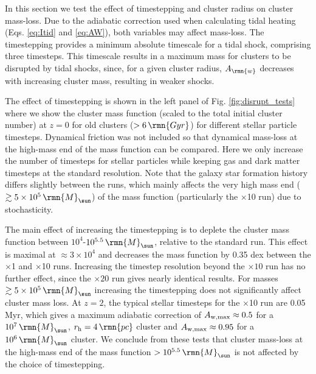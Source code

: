 \documentclass[fleqn,usenatbib]{mnras}
\newcommand\Msun{\,\rmn{M}_{\sun}}
\newcommand\Gyr{\,\rmn{Gyr}}
\newcommand\pc{\,\rmn{pc}}
\begin{document}
In this section we test the effect of timestepping and cluster radius on cluster mass-loss.
Due to the adiabatic correction used when calculating tidal heating (Eqs. \ref{eq:Itid} and \ref{eq:AW}), both variables may affect mass-loss.
The timestepping provides a minimum absolute timescale for a tidal shock, comprising three timesteps. This timescale results in a maximum mass for clusters to be disrupted by tidal shocks, since, for a given cluster radius, $A_\rmn{w}$ decreases with increasing cluster mass, resulting in weaker shocks.

The effect of timestepping is shown in the left panel of Fig. \ref{fig:disrupt_tests} where we show the cluster mass function (scaled to the total initial cluster number) at $z=0$ for old clusters ($>6 \Gyr$) for different stellar particle timesteps. Dynamical friction was not included so that dynamical mass-loss at the high-mass end of the mass function can be compared. Here we only increase the number of timesteps for stellar particles while keeping gas and dark matter timesteps at the standard resolution. Note that the galaxy star formation history differs slightly between the runs, which mainly affects the very high mass end ($\gtrsim5\times10^5 \Msun$) of the mass function (particularly the $\times$10 run) due to stochasticity. 

The main effect of increasing the timestepping is to deplete the cluster mass function between $10^4$-$10^{5.5}\Msun$, relative to the standard run. This effect is maximal at $\approx3\times10^4$ and decreases the mass function by 0.35 dex between the $\times$1 and $\times$10 runs. Increasing the timestep resolution beyond the $\times10$ run has no further effect, since the $\times20$ run gives nearly identical results.
For masses $\gtrsim5 \times 10^5 \Msun$ increasing the timestepping does not significantly affect cluster mass loss.
At $z=2$, the typical stellar timesteps for the $\times$10 run are 0.05 Myr, which gives a maximum adiabatic correction of $A_{\rm w,max} \approx 0.5$ for a $10^7 \Msun$, $r_{\rm h} = 4 \pc$ cluster and $A_{\rm w,max} \approx 0.95$ for a $10^6 \Msun$ cluster. We conclude from these tests that cluster mass-loss at the high-mass end of the mass function $>10^{5.5}\Msun$ is not affected by the choice of timestepping.
\end{document}
